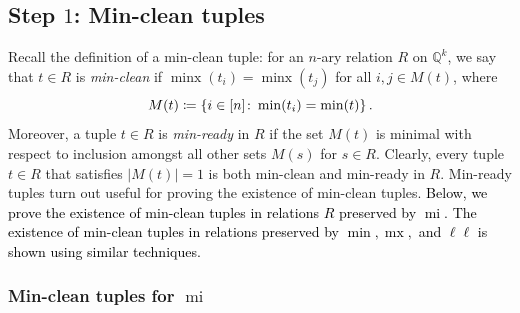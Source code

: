 \documentclass[a4paper,reqno, cleveref]{amsart}
\newcommand{\coloneqq}{\mathrel{\mathop:}\mathrel{\mkern-1.2mu}=}
\newcommand{\Q}{\mathbb{Q}}
\newcommand{\br}[1]{[#1]}
\DeclareMathOperator{\mx}{mx}
\DeclareMathOperator{\mi}{mi}
\DeclareMathOperator{\minx}{minx}
\newcommand\jo[1]{\textcolor{black}{#1}} %
\begin{document}
\begin{figure}[t]
\end{figure}

\subsection{Step \texorpdfstring{$1$}{1}: Min-clean tuples}\label{section:minclean}
Recall the definition of a min-clean tuple: for an $n$-ary relation $R$  on $\Q^k$, we say that $t \in R$ is \emph{min-clean} if $\minx(t_i)=\minx(t_j)$ for all $i,j \in M(t)$, where 
\[M(t)\coloneqq\left\{i \in \br n \colon \min(t_i)=\min(t)\right\}.\]
Moreover, a tuple $t \in R$ is \emph{min-ready} in $R$ if the set $M(t)$ is minimal with respect to inclusion amongst all other sets $M(s)$ for $s \in R$. Clearly, every tuple $t \in R$ that satisfies $|M(t)|=1$ is both min-clean and min-ready in $R$. Min-ready tuples turn out useful for proving the existence of min-clean tuples. %
\jo{Below, we prove the existence of min-clean tuples in relations $R$ preserved by $\mi$. The existence of min-clean tuples in relations preserved by $\min, \mx, $ and $\ell \ell$ is shown using similar techniques. }



\subsubsection{Min-clean tuples for \texorpdfstring{$\mi$}{mi}}\label{subsect:mi}
\end{document}
